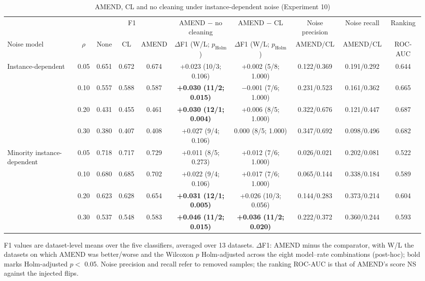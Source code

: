 \documentclass[conference]{IEEEtran}
\begin{document}
\begin{table}[!t]
\centering
\footnotesize
\caption{AMEND, CL and no cleaning under instance-dependent noise (Experiment 10)}
\label{tab:7}
\setlength{\tabcolsep}{3.5pt}
\begin{adjustbox}{max width=\linewidth}
\begin{tabular}{lccccccccc}
\hline
&  & \multicolumn{3}{c}{F1} & AMEND $-$ no cleaning & AMEND $-$ CL & Noise precision & Noise recall & Ranking \\
Noise model & $\rho $ & None & CL & AMEND & $\Delta $F1 (W/L; $p_{\mathrm{Holm}}$) & $\Delta $F1 (W/L; $p_{\mathrm{Holm}}$) & AMEND/CL & AMEND/CL & ROC-AUC \\
\hline
Instance-dependent & 0.05 & 0.651 & 0.672 & 0.674 & +0.023 (10/3; 0.106) & +0.002 (5/8; 1.000) & 0.122/0.369 & 0.191/0.292 & 0.644 \\
& 0.10 & 0.557 & 0.588 & 0.587 & \textbf{+0.030 (11/2; 0.015)} & $-$0.001 (7/6; 1.000) & 0.231/0.523 & 0.161/0.362 & 0.665 \\
& 0.20 & 0.431 & 0.455 & 0.461 & \textbf{+0.030 (12/1; 0.004)} & +0.006 (8/5; 1.000) & 0.322/0.676 & 0.121/0.447 & 0.687 \\
& 0.30 & 0.380 & 0.407 & 0.408 & +0.027 (9/4; 0.106) & 0.000 (8/5; 1.000) & 0.347/0.692 & 0.098/0.496 & 0.682 \\
Minority instance-dependent & 0.05 & 0.718 & 0.717 & 0.729 & +0.011 (8/5; 0.273) & +0.012 (7/6; 1.000) & 0.026/0.021 & 0.202/0.081 & 0.522 \\
& 0.10 & 0.680 & 0.685 & 0.702 & +0.022 (9/4; 0.106) & +0.017 (7/6; 1.000) & 0.065/0.144 & 0.338/0.184 & 0.589 \\
& 0.20 & 0.623 & 0.628 & 0.654 & \textbf{+0.031 (12/1; 0.005)} & +0.026 (10/3; 0.056) & 0.144/0.283 & 0.373/0.214 & 0.604 \\
& 0.30 & 0.537 & 0.548 & 0.583 & \textbf{+0.046 (11/2; 0.015)} & \textbf{+0.036 (11/2; 0.020)} & 0.222/0.372 & 0.360/0.244 & 0.593 \\
\hline
\end{tabular}
\end{adjustbox}
\par\vspace{3pt}
\begin{minipage}{\linewidth}\scriptsize F1 values are dataset-level means over the five classifiers, averaged over 13 datasets. $\Delta $F1: AMEND minus the comparator, with W/L the datasets on which AMEND was better/worse and the Wilcoxon $p$ Holm-adjusted across the eight model--rate combinations (post-hoc); bold marks Holm-adjusted $p <$ 0.05. Noise precision and recall refer to removed samples; the ranking ROC-AUC is that of AMEND's score NS against the injected flips.\end{minipage}
\end{table}
\end{document}
